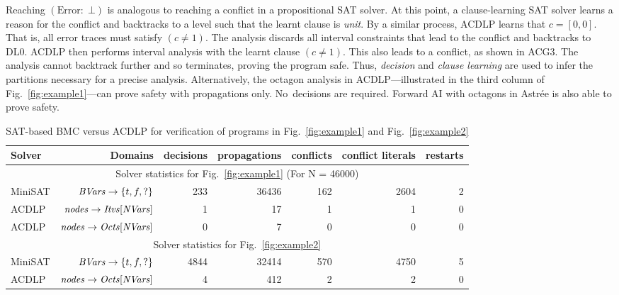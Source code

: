 Reaching $(\mathrm{Error}{:}\;\bot)$ is analogous to reaching a conflict in
a propositional SAT solver.  At this point, a clause-learning SAT solver
learns a reason for the conflict and backtracks to a level such that the
learnt clause is \textit{unit}.  By a similar process, ACDLP learns that
$c=[0,0]$.  That is, all error traces must satisfy $(c \neq 1)$.  The
analysis discards all interval constraints that lead to the conflict and
backtracks to DL0.  ACDLP then performs interval analysis with the learnt
clause $(c \neq 1)$.  This also leads to a conflict, as shown in ACG3.  The
analysis cannot backtrack further and so terminates, proving the program
safe.  Thus, {\em decision} and {\em clause learning} are used to infer the
partitions necessary for a precise analysis.  Alternatively, the octagon
analysis in ACDLP---illustrated in the third column of
Fig.~\ref{fig:example1}---can prove safety with propagations only. 
No~decisions are required.  Forward AI with octagons in Astr{\'e}e is also
able to prove safety.  
%
\begin{table}[!b]
\begin{center}
{
\begin{tabular}{l|r|r|r|r|r|r}
\hline
  Solver & Domains & decisions & propagations & conflicts & conflict literals & restarts \\ \hline
  \multicolumn{7}{c}{Solver statistics for Fig.~\ref{fig:example1} (For N = 46000)} \\ \hline
  MiniSAT & $\mathit{BVars} \rightarrow \{t,f,?\} $ & 233 & 36436 & 162 & 2604 & 2 \\ \hline
  ACDLP & $\mathit{nodes} \rightarrow \mathit{Itvs}[\mathit{NVars}]$ & 1 & 17 & 1 & 1 & 0 \\ \hline
  ACDLP & $\mathit{nodes} \rightarrow \mathit{Octs}[\mathit{NVars}]$ & 0 & 7 & 0 & 0 & 0 \\ \hline 
  \multicolumn{7}{c}{Solver statistics for Fig.~\ref{fig:example2}} \\ \hline
  MiniSAT & $\mathit{BVars} \rightarrow \{t,f,?\} $ & 4844 & 32414 & 570 & 4750 & 5 \\ \hline
  ACDLP & $\mathit{nodes} \rightarrow \mathit{Octs}[\mathit{NVars}]$ & 4 & 412 & 2 & 2 & 0 \\ 
\hline
\end{tabular}
}
\end{center}
\caption{SAT-based BMC versus ACDLP for verification of programs in Fig.~\ref{fig:example1} and
  Fig.~\ref{fig:example2}}
\label{solver}
\end{table}
%
%
